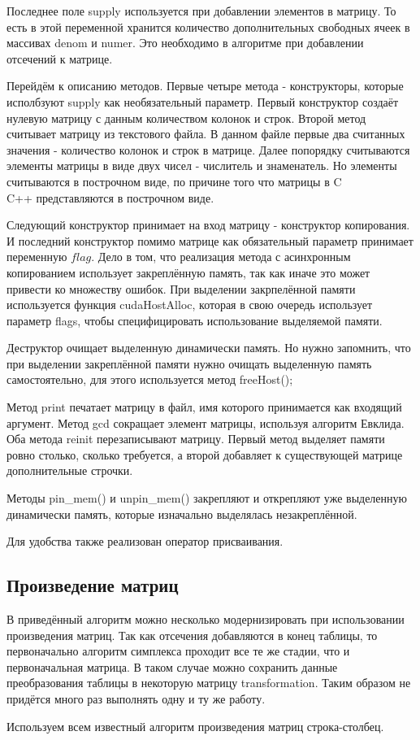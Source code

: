 \documentclass[a4paper,14pt,russian]{extreport}
\begin{document}
\par 
Последнее поле supply используется при добавлении элементов в матрицу. То есть в этой переменной хранится количество дополнительных свободных ячеек в массивах denom и numer. Это необходимо в алгоритме при добавлении отсечений к матрице.
\par
Перейдём к описанию методов. Первые четыре метода - конструкторы, которые исполбзуют supply как необязательный параметр. Первый конструктор создаёт нулевую матрицу с данным количеством колонок и строк. Второй метод считывает матрицу из текстового файла. В данном файле первые два считанных значения - количество колонок и строк в матрице. Далее попорядку считываются элементы матрицы в виде двух чисел - числитель и знаменатель. Но элементы считываются в построчном виде, по причине того что матрицы в C\\C++ представляются в построчном виде. 
\par
Следующий конструктор принимает на вход матрицу - конструктор копирования. И последний конструктор помимо матрице как обязательный параметр принимает переменную $flag$. Дело в том, что реализация метода с асинхронным копированием использует закреплённую память, так как иначе это может привести ко множеству ошибок. При выделении закрпелённой памяти используется функция cudaHostAlloc, которая в свою очередь использует параметр flags, чтобы специфицировать использование выделяемой памяти.
\par
Деструктор очищает выделенную динамически память. Но нужно запомнить, что при выделении закреплённой памяти нужно очищать выделенную память самостоятельно, для этого используется метод freeHost();
\par
Метод print печатает матрицу в файл, имя которого принимается как входящий аргумент. Метод gcd сокращает элемент матрицы, используя алгоритм Евклида. Оба метода reinit перезаписывают матрицу. Первый метод выделяет памяти ровно столько, сколько требуется, а второй добавляет к существующей матрице дополнительные строчки. 
\par
Методы pin\_mem() и unpin\_mem() закрепляют и открепляют уже выделенную динамически память, которые изначально выделялась незакреплённой.
\par
Для удобства также реализован оператор присваивания.

\subsection{Произведение матриц}
В приведённый алгоритм можно несколько модернизировать при использовании произведения матриц. Так как отсечения добавляются в конец таблицы, то первоначально алгоритм симплекса проходит все те же стадии, что и первоначальная матрица. В таком случае можно сохранить данные преобразования таблицы в некоторую матрицу transformation. Таким образом не придётся много раз выполнять одну и ту же работу. 
\par
Используем всем известный алгоритм произведения матриц строка-столбец. 
 
\end{document}
